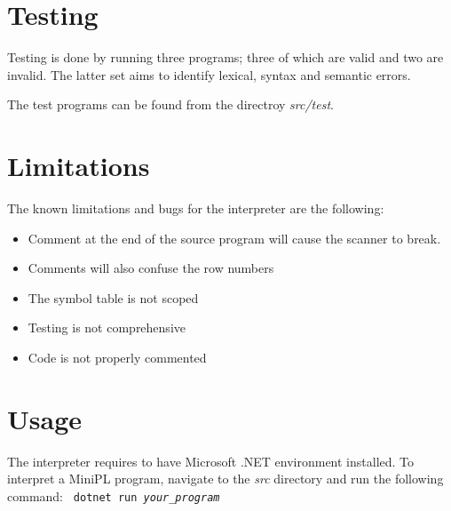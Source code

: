 \documentclass[fleqn]{article}
\begin{document}
\section{Testing}
Testing is done by running three programs; three of which are valid and two are invalid. The latter set aims to identify lexical, syntax and semantic errors.
\par
The test programs can be found from the directroy \textit{src/test}.
\section{Limitations}
\par
The known limitations and bugs for the interpreter are the following:

\begin{itemize}
    \item Comment at the end of the source program will cause the scanner to break.
    \item Comments will also confuse the row numbers
    \item The symbol table is not scoped
    \item Testing is not comprehensive
    \item Code is not properly commented
\end{itemize}

\section{Usage}
The interpreter requires to have Microsoft .NET environment installed. To interpret a MiniPL program, navigate to the \textit{src} directory and run the following command:
\newline
\newline
\texttt{
    dotnet run \textit{your\_program}
}

\appendix

\appendix

\end{document}
